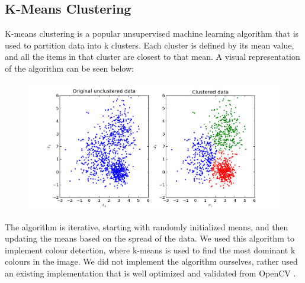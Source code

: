 \documentclass[a4paper,11pt]{article}
\begin{document}
\subsection{K-Means Clustering}
K-means clustering is a popular unsupervised machine learning algorithm that is used to partition data into k clusters. Each cluster is defined by its mean value, and all the items in that cluster are closest to that mean. A visual representation of the algorithm can be seen below:
\begin{figure}[H]
    \centering
    \includegraphics[scale=0.45]{img/k_means_visualization.png}
    \label{fig:k_means_visualization}
\end{figure}

The algorithm is iterative, starting with randomly initialized means, and then updating the means based on the spread of the data. We used this algorithm to implement colour detection, where k-means is used to find the most dominant k colours in the image. We did not implement the algorithm ourselves, rather used an existing implementation that is well optimized and validated from OpenCV \cite{k-means-opencv}.
\end{document}
